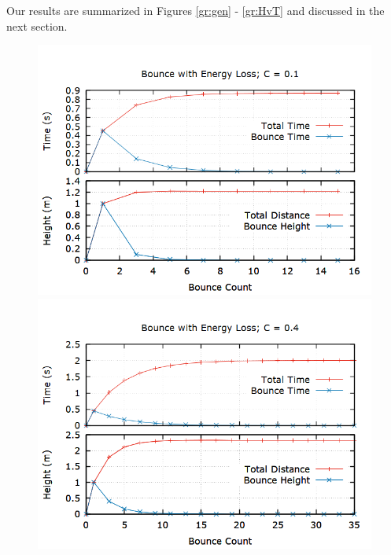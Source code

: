 \documentclass[aps,prl,twocolumn,superscriptaddress]{revtex4-1}
\begin{document}
Our results are summarized in Figures \ref{gr:gen} - \ref{gr:HvT} and discussed in the next section.

\begin{figure}[htbp]
 	\begin{center}
 		\includegraphics[scale=0.27]{01.png}
  		
 		\includegraphics[scale=0.27]{04.png}
  		

\end{center}
\end{figure}
\end{document}
